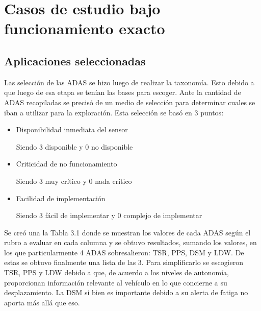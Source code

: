 \chapter{Casos de estudio bajo funcionamiento exacto}
\label{ch:visioncontrol}

\section{Aplicaciones seleccionadas}

Las selección de las ADAS se hizo luego de realizar la taxonomía. Esto debido a que luego de esa etapa se tenían las bases para escoger. Ante la cantidad de ADAS recopiladas se precisó de un medio de selección para determinar cuales se iban a utilizar para la exploración. Esta selección se basó en 3 puntos:
\begin{itemize}
    \item Disponibilidad inmediata del sensor
    
        Siendo 3 disponible y 0 no disponible
    
    \item Criticidad de no funcionamiento
    
        Siendo 3 muy crítico y 0 nada crítico  
    
    \item Facilidad de implementación
    
        Siendo 3 fácil de implementar y 0 complejo de implementar
\end{itemize}

Se creó una la Tabla 3.1 donde se muestran los valores de cada ADAS según el rubro a evaluar en cada columna y se obtuvo resultados, sumando los valores, en los que particularmente 4 ADAS sobresalieron: TSR, PPS, DSM y LDW. De estas se obtuvo finalmente una lista de las 3. Para simplificarlo se escogieron TSR, PPS y LDW debido a que, de acuerdo a los niveles de autonomía, proporcionan información relevante al vehículo en lo que concierne a su desplazamiento. La DSM si bien es importante debido a su alerta de fatiga no aporta más allá que eso.


